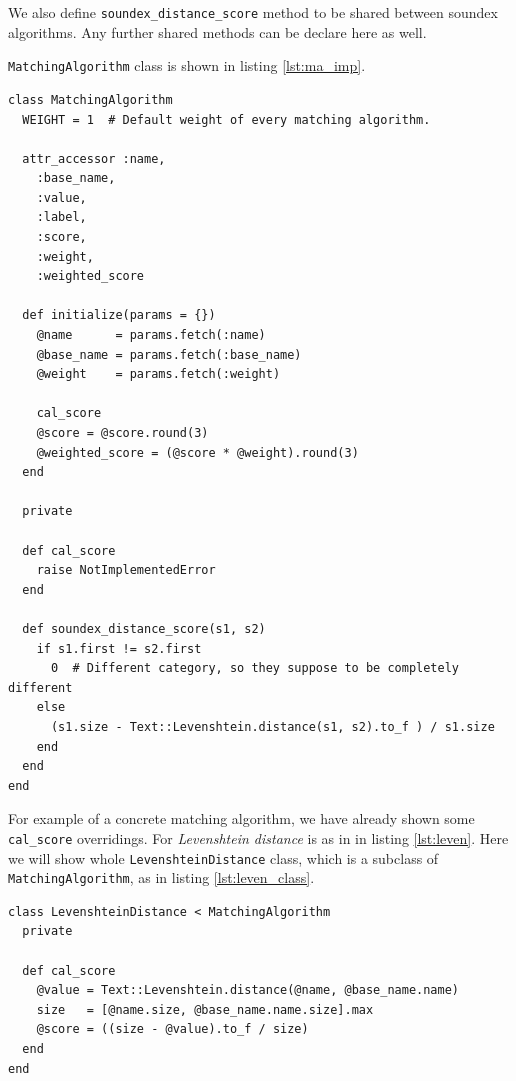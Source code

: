 We also define \texttt{soundex\_distance\_score} method to be shared
between soundex algorithms. Any further shared methods can be declare
here as well.

\texttt{MatchingAlgorithm} class is shown in listing \ref{lst:ma_imp}.

\begin{minipage}{\linewidth}
\begin{lstlisting}[label={lst:ma_imp}, caption={\texttt{MatchingAlgorithm} class.}]
class MatchingAlgorithm
  WEIGHT = 1  # Default weight of every matching algorithm.

  attr_accessor :name,
    :base_name,
    :value,
    :label,
    :score,
    :weight,
    :weighted_score

  def initialize(params = {})
    @name      = params.fetch(:name)
    @base_name = params.fetch(:base_name)
    @weight    = params.fetch(:weight)

    cal_score
    @score = @score.round(3)
    @weighted_score = (@score * @weight).round(3)
  end

  private

  def cal_score
    raise NotImplementedError
  end

  def soundex_distance_score(s1, s2)
    if s1.first != s2.first
      0  # Different category, so they suppose to be completely different
    else
      (s1.size - Text::Levenshtein.distance(s1, s2).to_f ) / s1.size
    end
  end
end
\end{lstlisting}
\end{minipage}

For example of a concrete matching algorithm,
we have already shown some \texttt{cal\_score} overridings. For
\emph{Levenshtein distance} is as in in listing \ref{lst:leven}.
Here we will show whole \texttt{LevenshteinDistance} class,
which is a subclass of \texttt{MatchingAlgorithm}, as in listing \ref{lst:leven_class}.

\begin{minipage}{\linewidth}
\begin{lstlisting}[label={lst:leven_class}, caption={\texttt{LevenshteinDistance} class.}]
class LevenshteinDistance < MatchingAlgorithm
  private

  def cal_score
    @value = Text::Levenshtein.distance(@name, @base_name.name)
    size   = [@name.size, @base_name.name.size].max
    @score = ((size - @value).to_f / size)
  end
end
\end{lstlisting}
\end{minipage}


